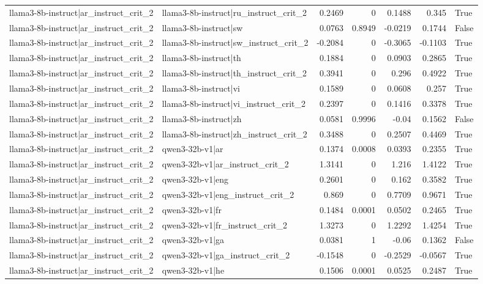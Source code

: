 \begin{table}
\begin{tabular}{l l r r r r l}
llama3-8b-instruct|ar_instruct_crit_2 & llama3-8b-instruct|ru_instruct_crit_2 & 0.2469 & 0 & 0.1488 & 0.345 & True \\
llama3-8b-instruct|ar_instruct_crit_2 & llama3-8b-instruct|sw & 0.0763 & 0.8949 & -0.0219 & 0.1744 & False \\
llama3-8b-instruct|ar_instruct_crit_2 & llama3-8b-instruct|sw_instruct_crit_2 & -0.2084 & 0 & -0.3065 & -0.1103 & True \\
llama3-8b-instruct|ar_instruct_crit_2 & llama3-8b-instruct|th & 0.1884 & 0 & 0.0903 & 0.2865 & True \\
llama3-8b-instruct|ar_instruct_crit_2 & llama3-8b-instruct|th_instruct_crit_2 & 0.3941 & 0 & 0.296 & 0.4922 & True \\
llama3-8b-instruct|ar_instruct_crit_2 & llama3-8b-instruct|vi & 0.1589 & 0 & 0.0608 & 0.257 & True \\
llama3-8b-instruct|ar_instruct_crit_2 & llama3-8b-instruct|vi_instruct_crit_2 & 0.2397 & 0 & 0.1416 & 0.3378 & True \\
llama3-8b-instruct|ar_instruct_crit_2 & llama3-8b-instruct|zh & 0.0581 & 0.9996 & -0.04 & 0.1562 & False \\
llama3-8b-instruct|ar_instruct_crit_2 & llama3-8b-instruct|zh_instruct_crit_2 & 0.3488 & 0 & 0.2507 & 0.4469 & True \\
llama3-8b-instruct|ar_instruct_crit_2 & qwen3-32b-v1|ar & 0.1374 & 0.0008 & 0.0393 & 0.2355 & True \\
llama3-8b-instruct|ar_instruct_crit_2 & qwen3-32b-v1|ar_instruct_crit_2 & 1.3141 & 0 & 1.216 & 1.4122 & True \\
llama3-8b-instruct|ar_instruct_crit_2 & qwen3-32b-v1|eng & 0.2601 & 0 & 0.162 & 0.3582 & True \\
llama3-8b-instruct|ar_instruct_crit_2 & qwen3-32b-v1|eng_instruct_crit_2 & 0.869 & 0 & 0.7709 & 0.9671 & True \\
llama3-8b-instruct|ar_instruct_crit_2 & qwen3-32b-v1|fr & 0.1484 & 0.0001 & 0.0502 & 0.2465 & True \\
llama3-8b-instruct|ar_instruct_crit_2 & qwen3-32b-v1|fr_instruct_crit_2 & 1.3273 & 0 & 1.2292 & 1.4254 & True \\
llama3-8b-instruct|ar_instruct_crit_2 & qwen3-32b-v1|ga & 0.0381 & 1 & -0.06 & 0.1362 & False \\
llama3-8b-instruct|ar_instruct_crit_2 & qwen3-32b-v1|ga_instruct_crit_2 & -0.1548 & 0 & -0.2529 & -0.0567 & True \\
llama3-8b-instruct|ar_instruct_crit_2 & qwen3-32b-v1|he & 0.1506 & 0.0001 & 0.0525 & 0.2487 & True \\

\end{tabular}
\end{table}
